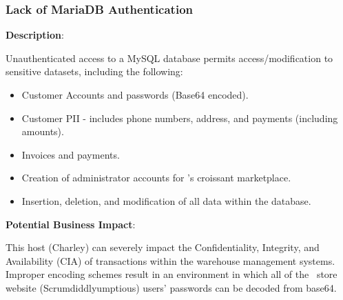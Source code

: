 \subsubsection{Lack of MariaDB Authentication}
\label{sec:mysql_no_auth}

\noindent
{}

\color{black}{}
\noindent
\textbf{Description}:

    Unauthenticated access to a MySQL database permits access/modification to sensitive datasets, including the following:
    
    \begin{itemize}
        \item Customer Accounts and passwords (Base64 encoded).
        \item Customer PII - includes phone numbers, address, and payments (including amounts).
        \item Invoices and payments.
        \item Creation of administrator accounts for \cptc's croissant marketplace.
        \item Insertion, deletion, and modification of all data within the database.
    \end{itemize}


\noindent
\textbf{Potential Business Impact}:

    This host (Charley) can severely impact the  Confidentiality, Integrity, and Availability (CIA) of transactions within the warehouse management systems. Improper encoding schemes result in an environment in which all of the \cptc\ store website (Scrumdiddlyumptious) users' passwords can be decoded from base64.
    
